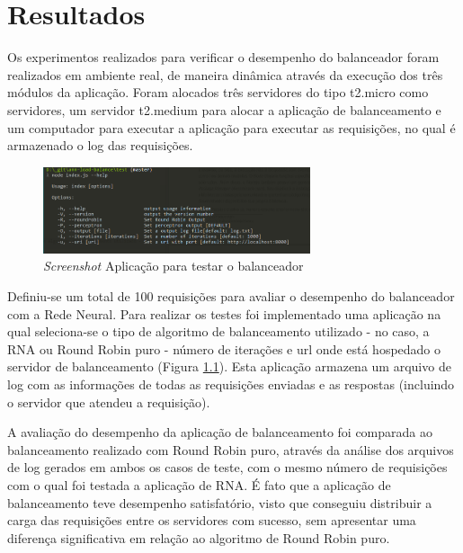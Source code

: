 \chapter{Resultados}\label{cap:resultados}

Os experimentos realizados para verificar o desempenho do balanceador foram realizados em ambiente real, de maneira dinâmica através da execução dos três módulos da aplicação. Foram alocados três servidores do tipo t2.micro como servidores, um servidor t2.medium para alocar a aplicação de balanceamento e um computador para executar a aplicação para executar as requisições, no qual é armazenado o log das requisições. 
\begin{figure}[htb]
	\caption{\label{fig:tests} \textit{Screenshot} Aplicação para testar o balanceador}
	\begin{center}
		\includegraphics[width=0.70\textwidth]{img/testeapp.png}
	\end{center}
\end{figure}
Definiu-se um total de 100 requisições para avaliar o desempenho do balanceador com a Rede Neural. Para realizar os testes foi implementado uma aplicação na qual seleciona-se o tipo de algoritmo de balanceamento utilizado - no caso, a RNA ou Round Robin puro - número de iterações e url onde está hospedado o servidor de balanceamento (Figura \ref{fig:tests}). Esta aplicação armazena um arquivo de log com as informações de todas as requisições enviadas e as respostas (incluindo o servidor que atendeu a requisição). 

A avaliação do desempenho da aplicação de balanceamento foi comparada ao balanceamento realizado com Round Robin puro, através da análise dos arquivos de log gerados em ambos os casos de teste, com o mesmo número de requisições com o qual foi testada a aplicação de RNA. É fato que a aplicação de balanceamento teve desempenho satisfatório, visto que conseguiu distribuir a carga das requisições entre os servidores com sucesso, sem apresentar uma diferença significativa em relação ao algoritmo de Round Robin puro. 

